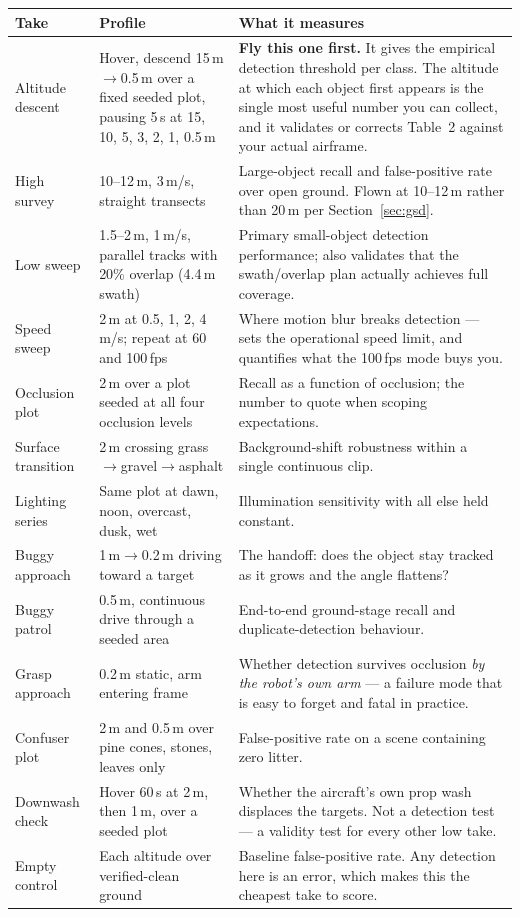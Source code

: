 \documentclass[11pt,a4paper]{article}
\begin{document}
\begin{longtable}{p{3.4cm}p{4.1cm}p{7.3cm}}
\toprule
\textbf{Take} & \textbf{Profile} & \textbf{What it measures} \\
\midrule
\endhead
Altitude descent & Hover, descend 15\,m$\rightarrow$0.5\,m over a fixed seeded plot, pausing 5\,s at 15, 10, 5, 3, 2, 1, 0.5\,m & \textbf{Fly this one first.} It gives the empirical detection threshold per class. The altitude at which each object first appears is the single most useful number you can collect, and it validates or corrects Table~2 against your actual airframe. \\
\addlinespace
High survey & 10--12\,m, 3\,m/s, straight transects & Large-object recall and false-positive rate over open ground. Flown at 10--12\,m rather than 20\,m per Section~\ref{sec:gsd}. \\
\addlinespace
Low sweep & 1.5--2\,m, 1\,m/s, parallel tracks with 20\% overlap (4.4\,m swath) & Primary small-object detection performance; also validates that the swath/overlap plan actually achieves full coverage. \\
\addlinespace
Speed sweep & 2\,m at 0.5, 1, 2, 4\,m/s; repeat at 60 and 100\,fps & Where motion blur breaks detection --- sets the operational speed limit, and quantifies what the 100\,fps mode buys you. \\
\addlinespace
Occlusion plot & 2\,m over a plot seeded at all four occlusion levels & Recall as a function of occlusion; the number to quote when scoping expectations. \\
\addlinespace
Surface transition & 2\,m crossing grass$\rightarrow$gravel$\rightarrow$asphalt & Background-shift robustness within a single continuous clip. \\
\addlinespace
Lighting series & Same plot at dawn, noon, overcast, dusk, wet & Illumination sensitivity with all else held constant. \\
\addlinespace
Buggy approach & 1\,m$\rightarrow$0.2\,m driving toward a target & The handoff: does the object stay tracked as it grows and the angle flattens? \\
\addlinespace
Buggy patrol & 0.5\,m, continuous drive through a seeded area & End-to-end ground-stage recall and duplicate-detection behaviour. \\
\addlinespace
Grasp approach & 0.2\,m static, arm entering frame & Whether detection survives occlusion \emph{by the robot's own arm} --- a failure mode that is easy to forget and fatal in practice. \\
\addlinespace
Confuser plot & 2\,m and 0.5\,m over pine cones, stones, leaves only & False-positive rate on a scene containing zero litter. \\
\addlinespace
Downwash check & Hover 60\,s at 2\,m, then 1\,m, over a seeded plot & Whether the aircraft's own prop wash displaces the targets. Not a detection test --- a validity test for every other low take. \\
\addlinespace
Empty control & Each altitude over verified-clean ground & Baseline false-positive rate. Any detection here is an error, which makes this the cheapest take to score. \\
\bottomrule
\end{longtable}
\end{document}
